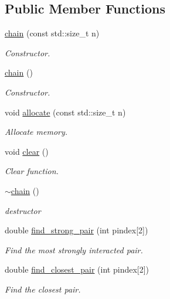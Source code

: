 \subsection*{Public Member Functions}
\begin{DoxyCompactItemize}
\item 
\hyperlink{classARC_1_1chain_a8a3daa4bad15c5faeaebece934a0ae4a}{chain} (const std\+::size\+\_\+t n)
\begin{DoxyCompactList}\small\item\em Constructor. \end{DoxyCompactList}\item 
\hyperlink{classARC_1_1chain_a8590b2bc343867d9ef246946f3002063}{chain} ()
\begin{DoxyCompactList}\small\item\em Constructor. \end{DoxyCompactList}\item 
void \hyperlink{classARC_1_1chain_aee00fac50bb4a5a24ab1af5e563bdf98}{allocate} (const std\+::size\+\_\+t n)
\begin{DoxyCompactList}\small\item\em Allocate memory. \end{DoxyCompactList}\item 
void \hyperlink{classARC_1_1chain_a4cf8d7e8253d71ce0110fb827add1b32}{clear} ()
\begin{DoxyCompactList}\small\item\em Clear function. \end{DoxyCompactList}\item 
\hyperlink{classARC_1_1chain_af83c26f178fd88947cdd53fa4b6cb047}{$\sim$chain} ()
\begin{DoxyCompactList}\small\item\em destructor \end{DoxyCompactList}\item 
double \hyperlink{classARC_1_1chain_a2ba334c62d603425faadda4019021dc4}{find\+\_\+strong\+\_\+pair} (int pindex\mbox{[}2\mbox{]})
\begin{DoxyCompactList}\small\item\em Find the most strongly interacted pair. \end{DoxyCompactList}\item 
double \hyperlink{classARC_1_1chain_ad5bbd543b79f0f2f3180d3a1b95914b9}{find\+\_\+closest\+\_\+pair} (int pindex\mbox{[}2\mbox{]})
\begin{DoxyCompactList}\small\item\em Find the closest pair. \end{DoxyCompactList}\item 

\end{DoxyCompactItemize}
